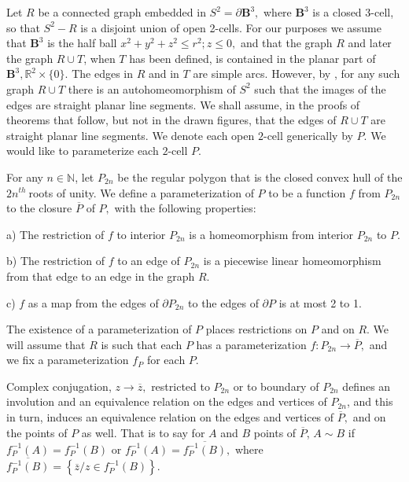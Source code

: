 \documentclass{amsproc}\usepackage{eurosym}
\theoremstyle{plain}
\numberwithin{equation}{section}
\begin{document}
Let $R$ be a connected graph embedded in $S^{2}=\partial\mathbf{B}^{3},$ where
$\mathbf{B}^{3}$ is a closed $3$-cell, so that $S^{2}-R$ is a disjoint union
of open 2-cells. For our purposes we assume that $\mathbf{B}^{3}$ is the half
ball $x^{2}+y^{2}+z^{2}\leq r^{2};z\leq0,$ and that the graph $R$ and later
the graph $R\cup T$, when $T$ has been defined, is contained in the planar
part of $\mathbf{B}^{3},\mathbb{R}^{2}\times\{0\}.$ The edges in $R$ and in
$T$ are simple arcs. However, by \cite{F1}, for any such graph $R\cup T$ there
is an autohomeomorphism of $S^{2}$ such that the images of the edges are
straight planar line segments. We shall assume, in the proofs of theorems that
follow, but not in the drawn figures, that the edges of $R\cup T$ are straight
planar line segments. We denote each open $2$-cell generically by $P.$ We
would like to parameterize each $2$-cell $P$.

For any $n\in\mathbb{N}$, let $P_{2n}$ be the regular polygon that is the
closed convex hull of the $2n^{th}\ $roots of unity. We define a
parameterization of $P$ to be a function $f$ from $P_{2n}$ to the closure
$\overline{P}$ of $P,$ with the following properties:

a) The restriction of $f$ to interior $P_{2n}$ is a homeomorphism from
interior $P_{2n}$ to $P.$

b) The restriction of $f$ to an edge of $P_{2n}$ is a piecewise linear
homeomorphism from that edge to an edge in the graph $R.$

c) $f$ as a map from the edges of $\partial P_{2n}$ to the edges of $\partial
P$ is at most 2 to 1.

The existence of a parameterization of $P$ places restrictions on $P$ and on
$R.$ We will assume that $R$ is such that each $P$ has a parameterization
$f:P_{2n}\rightarrow\overline{P},$ and we fix a parameterization $f_{P}$ for
each $P.$

Complex conjugation, $z\rightarrow\overline{z},$ restricted to $P_{2n}$ or to
boundary of $P_{2n}$ defines an involution and an equivalence relation on the
edges and vertices of $P_{2n}$, and this in turn, induces an equivalence
relation on the edges and vertices of $\overline{P},$ and on the points of $P
$ as well. That is to say for $A$ and $B$ points of $\overline{P}$, $A\sim B$
if $f_{P}^{-1}\left(  A\right)  =f_{P}^{-1}\left(  B\right)  $ or $f_{P}^{-1}\left(  A\right)  =\overline{f_{P}^{-1}\left(  B\right)  },$ where
$\overline{f_{P}^{-1}\left(  B\right)  }=\left\{  \overline{z}/z\in f_{P}^{-1}\left(  B\right)  \right\}  .$
\end{document}
